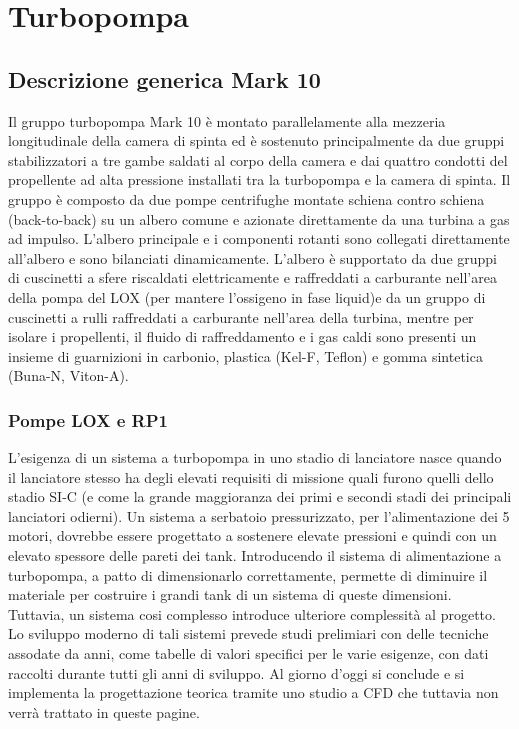 \section{Turbopompa}
\label{sec:turbopompa}

\subsection{Descrizione generica Mark 10}
\label{subsec:descrizione mark 10}

Il gruppo turbopompa Mark 10 è montato parallelamente alla mezzeria longitudinale della camera di spinta ed è sostenuto principalmente da due gruppi stabilizzatori a tre gambe saldati al corpo della camera e dai quattro condotti del propellente ad alta pressione installati tra la turbopompa e la camera di spinta. 
Il gruppo è composto da due pompe centrifughe montate schiena contro schiena (back-to-back) su un albero comune e azionate direttamente da una turbina a gas ad impulso.
L'albero principale e i componenti rotanti sono collegati direttamente all'albero e sono bilanciati dinamicamente.
L'albero è supportato da due gruppi di cuscinetti a sfere riscaldati elettricamente e raffreddati a carburante nell'area della pompa del LOX (per mantere l'ossigeno in fase liquid)e da un gruppo di cuscinetti a rulli raffreddati a carburante nell'area della turbina, mentre per isolare i propellenti, il fluido di raffreddamento e i gas caldi sono presenti un insieme di guarnizioni in carbonio, plastica (Kel-F, Teflon) e gomma sintetica (Buna-N, Viton-A).

\subsubsection{Pompe LOX e RP1}

L'esigenza di un sistema a turbopompa in uno stadio di lanciatore nasce quando il lanciatore stesso ha degli elevati requisiti di missione quali furono quelli dello stadio SI-C (e come la grande maggioranza dei primi e secondi stadi dei principali lanciatori odierni). Un sistema a serbatoio pressurizzato, per l'alimentazione dei 5 motori, dovrebbe essere progettato a sostenere elevate pressioni e quindi con un elevato spessore delle pareti dei tank. Introducendo il sistema di alimentazione a turbopompa, a patto di dimensionarlo correttamente, permette di diminuire il materiale per costruire i grandi tank di un sistema di queste dimensioni.
Tuttavia, un sistema cosi complesso introduce ulteriore complessità al progetto. Lo sviluppo moderno di tali sistemi prevede studi prelimiari con delle tecniche assodate da anni, come tabelle di valori specifici per le varie esigenze, con dati raccolti durante tutti gli anni di sviluppo. Al giorno d'oggi si conclude e si implementa la progettazione teorica tramite uno studio a CFD che tuttavia non verrà trattato in queste pagine. 

